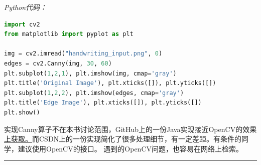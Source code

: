 \noindent
\emph{Python代码：}
\begin{lstlisting}[language=Python]
import cv2
from matplotlib import pyplot as plt

img = cv2.imread("handwriting_input.png", 0)
edges = cv2.Canny(img, 30, 60)
plt.subplot(1,2,1), plt.imshow(img, cmap='gray')
plt.title('Original Image'), plt.xticks([]), plt.yticks([])
plt.subplot(1,2,2), plt.imshow(edges, cmap='gray')
plt.title('Edge Image'), plt.xticks([]), plt.yticks([])
plt.show()
\end{lstlisting}

\noindent
实现Canny算子不在本书讨论范围，GitHub上的一份Java实现接近OpenCV的效果
\href{https://github.com/enzoftware/images-processing/blob/master/algorithms/Canny%20Filter/src/com/company/CannyFilter.java}
{上获取。}而CSDN上的一份实现简化了很多处理细节，有一定差距。有条件的同学，建议使用OpenCV的接口。
遇到的OpenCV问题，也容易在网络上检索。
\vspace{0.3cm}
\hrule
